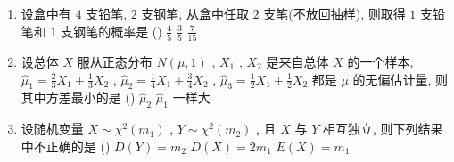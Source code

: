 \begin{enumerate}
	\item 设盒中有 $4$ 支铅笔, $2$ 支钢笔, 从盒中任取 $2$ 支笔(不放回抽样), 则取得 $1$ 支铅笔和 $1$ 支钢笔的概率是 (\hspace{1pc})
	{$\frac{4}{5}$}
	{$\frac{3}{5}$}
	{$\frac{7}{15}$}

	\item 设总体 $X$ 服从正态分布 $N(\mu,1)$ , $X_1$ , $X_2$ 是来自总体 $X$ 的一个样本, $\hat\mu_1=\frac{2}{3}X_1+\frac{1}{3}X_2$ , 
	$\hat\mu_2=\frac{1}{4}X_1+\frac{3}{4}X_2$ , $\hat\mu_3=\frac{1}{2}X_1+\frac{1}{2}X_2$ 都是 $\mu$ 的无偏估计量, 则其中方差最小的是 (\hspace{1pc})
	{$\hat\mu_2$}
	{$\hat\mu_1$}
	{一样大}

	\item 设随机变量 $X\sim\chi^2(m_1)$ , $Y\sim\chi^2(m_2)$ , 且 $X$ 与 $Y$ 相互独立, 则下列结果中不正确的是 (\hspace{1pc})
	{$D(Y)=m_2$}
	{$D(X)=2m_1$}
	{$E(X)=m_1$}
 \end{enumerate}

